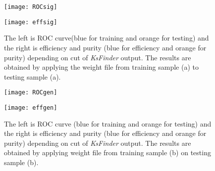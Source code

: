 \begin{figure}[htpb]
	\begin{minipage}[b]{0.5\linewidth}
		\centering 
		\texttt{[image: ROCsig]}
		\label{fig:ROC_3Ks}
	\end{minipage}
	\begin{minipage}[b]{0.5\linewidth}
		\centering 
		\texttt{[image: effsig]}
		\label{fig:eff_3Ks}
	\end{minipage}
\caption{The left is ROC curve(blue for training and orange for testing) and the right is efficiency and purity (blue for efficiency and orange for purity) depending on cut of \textit{KsFinder} output. The results are obtained by applying the weight file from training sample (a) to testing sample (a).}
\label{fig:3Ks_performance}
\end{figure}
\begin{figure}[htpb]
	\begin{minipage}[b]{0.5\linewidth}
		\centering 
		\texttt{[image: ROCgen]}
	\end{minipage}
	\begin{minipage}[b]{0.5\linewidth}
		\centering 
		\texttt{[image: effgen]}
	\end{minipage}
	\caption{The left is ROC curve (blue for training and orange for testing) and the right is efficiency and purity (blue for efficiency and orange for purity) depending on cut of \textit{KsFinder} output. The results are obtained by applying weight file from training sample (b) on testing sample (b).}
	\label{fig:gen_performance}
\end{figure}

